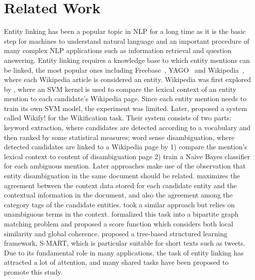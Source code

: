 \section{Related Work}


Entity linking has been a popular topic in NLP for a long time as it is the basic step for machines to understand natural language and an important procedure of many complex NLP applications such as information retrieval and question answering. Entity linking requires a knowledge base to which entity mentions can be linked, the most popular ones including Freebase~\cite{}, YAGO~\cite{} and Wikipedia~\cite{}, where each Wikipedia article is considered an entity. Wikipedia was first explored by \cite{bunescu2006using}, where an SVM kernel is used to compare the lexical context of an entity mention to each candidate's Wikipedia page. Since each entity mention needs to train its own SVM model, the experiment was limited. Later, \cite{mihalcea2007wikfy} proposed a system called Wikify! for the Wikification task. Their system consists of two parts: keyword extraction, where candidates are detected according to a vocabulary and then ranked by some statistical measures; word sense disambiguation, where detected candidates are linked to a Wikipedia page by 1) compare the mention's lexical context to content of disambiguation page 2) train a Naive Bayes classifier for each ambiguous mention. Later approaches make use of the observation that entity disambiguation in the same document should be related. \cite{cucerzan2007largescale} maximizes the agreement between the context data stored for each candidate entity and the contextual information in the document, and also the agreement among the category tags of the candidate entities. \cite{milne2008learning} took a similar approach but relies on unambiguous terms in the context. \cite{ratinov11local} formalized this task into a bipartite graph matching problem and proposed a score function which considers both local similarity and global coherence. \cite{yang15smart} proposed a tree-based structured learning framework, S-MART, which is particular suitable for short texts such as tweets. Due to its fundamental role in many applications, the task of entity linking has attracted a lot of attention, and many shared tasks have been proposed to promote this study.~\cite{}

